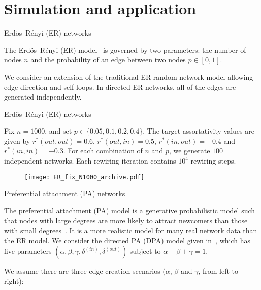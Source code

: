\documentclass[xcolor=dvipsnames, compress, 10pt]{beamer}
\theoremstyle{remark}
\newcommand{\deltain}{\delta^{(in)}}
\newcommand{\deltaout}{\delta^{(out)}}
\begin{document}

\section{Simulation and application}


\begin{frame}{Erd\"{o}s--R\'{e}nyi (ER) networks}


The Erd\"{o}s--R\'{e}nyi (ER) model~\citep{Erdos1959on, Gilbert1959random} is
governed by two parameters: the number of nodes $n$ and the probability of an
edge between two nodes $p \in [0, 1]$. 

\vspace{0.2cm}

We consider an extension of the traditional ER random network model allowing
edge direction and self-loops. In directed ER networks, all of the edges are
generated independently.
	
\end{frame}


\begin{frame}{Erd\"{o}s--R\'{e}nyi (ER) networks}

Fix $n = 1000$, and set $p \in \{0.05, 0.1, 0.2, 0.4\}$. The target 
assortativity
values are given by $r^*(out, out) = 0.6$, $r^*(out, in) = 0.5$, 
$r^*(in, out) = -0.4$ and $r^*(in, in) = -0.3$. 
For each combination of $n$ and $p$, we
generate $100$ independent networks. Each rewiring iteration contains
$10^4$ rewiring steps.
\begin{figure}[tbp]
	\centering
	\texttt{[image: ER\_fix\_N1000\_archive.pdf]}
\end{figure}
	
\end{frame}


\begin{frame}{Preferential attachment (PA) networks}

The preferential attachment (PA) model is a generative probabilistic model such
that nodes with large degrees are more likely to attract newcomers than those
with small degrees~\citep[e.g.,][]{Barabasi1999emergence, Krapivsky2001degree,
Krapivsky2001organization}. It is a more realistic model for many real network
data than the ER model. We consider the directed PA (DPA) model given
in~\cite{Bollobas2003proceedings}, which has five parameters $(\alpha, \beta,
\gamma, \deltain, \deltaout)$ subject to $\alpha + \beta + \gamma = 1$.

\vspace{0.2cm}

We assume there are three edge-creation scenarios ($\alpha$, $\beta$ and
$\gamma$, from left to	right):
	
\begin{figure}
	\centering
	
\end{figure}

\end{frame}
\end{document}

